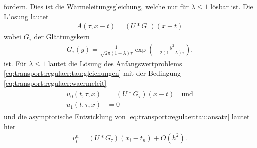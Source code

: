 fordern. Dies ist die Wärmeleitungsgleichung, welche nur für $\lambda \leq 1$ lösbar ist. Die L"osung lautet
\begin{align}
A(\tau, x-t) = (U * G_\tau)(x-t)
\end{align}
wobei $G_\tau$ der Glättungskern
\begin{align}
G_\tau(y) = \frac{1}{\sqrt{2 \pi (1-\lambda)\tau}} \exp\left( - \frac{y^2}{2 (1 - \lambda) \tau} \right).
\end{align} ist.
Für $\lambda \leq 1$ lautet die Lösung des Anfangswertproblems \eqref{eq:transport:regulaer:tau:gleichungen} mit der Bedingung \eqref{eq:transport:regulaer:waermeleit}
\begin{align}
\begin{split}
u_0(t,\tau,x) &= (U * G_\tau)(x - t) \quad \text{und}\\
u_1(t,\tau,x) &= 0
\end{split}
\end{align}
und die asymptotische Entwicklung von \eqref{eq:transport:regulaer:tau:ansatz} lautet hier
\begin{align}\label{eq:transport:regulaer:tau:ergebnis}
v^n_i = (U * G_\tau)(x_i - t_n) + O(h^2).
\end{align}